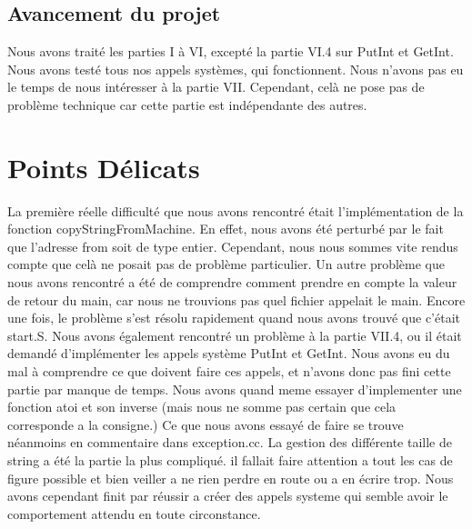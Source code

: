 \documentclass[12pt]{article}
\begin{document}
\bigbreak
\subsection{Avancement du projet}
Nous avons traité les parties I à VI, excepté la partie VI.4 sur \textcolor{blue2}{PutInt} et \textcolor{blue2}{GetInt}. Nous avons testé tous nos appels systèmes, qui fonctionnent. Nous n'avons pas eu le temps de nous intéresser à la partie VII. Cependant, celà ne pose pas de problème technique car cette partie est indépendante des autres.

\bigbreak
\bigbreak
\section {Points Délicats}
La première réelle difficulté que nous avons rencontré était l'implémentation de la fonction \textcolor{red2}{copyStringFromMachine}. En effet, nous avons été perturbé par le fait que l'adresse from soit de type entier. Cependant, nous nous sommes vite rendus compte que celà ne posait pas de problème particulier.
\newline
Un autre problème que nous avons rencontré a été de comprendre comment prendre en compte la valeur de retour du main, car nous ne trouvions pas quel fichier appelait le main. Encore une fois, le problème s'est résolu rapidement quand nous avons trouvé que c'était \textcolor{vert2}{start.S}.
\newline
Nous avons également rencontré un problème à la partie VII.4, ou il était demandé d'implémenter les appels système \textcolor{blue2}{PutInt} et \textcolor{blue2}{GetInt}. Nous avons eu du mal à comprendre ce que doivent faire ces appels, et n'avons donc pas fini cette partie par manque de temps.
Nous avons quand meme essayer d'implementer une fonction atoi et son inverse (mais nous ne somme pas certain que cela corresponde a la consigne.) Ce que nous avons essayé de faire se trouve néanmoins en commentaire dans \textcolor{vert2}{exception.cc}.
\newline
La gestion des différente taille de string a été la partie la plus compliqué. il fallait faire attention a tout les cas de figure possible et bien veiller a ne rien perdre en route ou a en écrire trop. Nous avons cependant finit par réussir a créer des appels systeme qui semble avoir le comportement attendu en toute circonstance.
\bigbreak
\bigbreak
\end{document}
